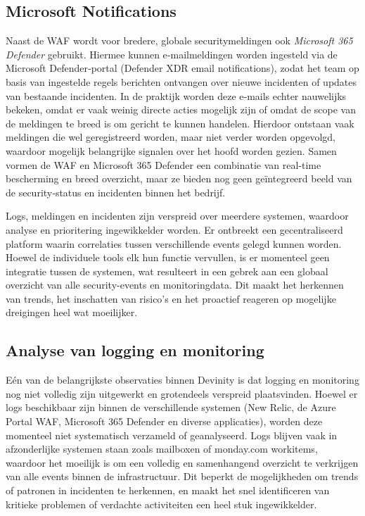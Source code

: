 \subsection{Microsoft Notifications}
Naast de WAF wordt voor bredere, globale securitymeldingen ook \textit{Microsoft 365 Defender} gebruikt. Hiermee kunnen e‑mailmeldingen worden ingesteld via de Microsoft Defender‑portal (Defender XDR email notifications), zodat het team op basis van ingestelde regels berichten ontvangen over nieuwe incidenten of updates van bestaande incidenten. In de praktijk worden deze e‑mails echter nauwelijks bekeken, omdat er vaak weinig directe acties mogelijk zijn of omdat de scope van de meldingen te breed is om gericht te kunnen handelen. Hierdoor ontstaan vaak meldingen die wel geregistreerd worden, maar niet verder worden opgevolgd, waardoor mogelijk belangrijke signalen over het hoofd worden gezien. Samen vormen de WAF en Microsoft 365 Defender een combinatie van real‑time bescherming en breed overzicht, maar ze bieden nog geen geïntegreerd beeld van de security‑status en incidenten binnen het bedrijf.

Logs, meldingen en incidenten zijn verspreid over meerdere systemen, waardoor analyse en prioritering ingewikkelder worden. Er ontbreekt een gecentraliseerd platform waarin correlaties tussen verschillende events gelegd kunnen worden. Hoewel de individuele tools elk hun functie vervullen, is er momenteel geen integratie tussen de systemen, wat resulteert in een gebrek aan een globaal overzicht van alle security-events en monitoringdata. Dit maakt het herkennen van trends, het inschatten van risico’s en het proactief reageren op mogelijke dreigingen heel wat moeilijker.


\subsection{Analyse van logging en monitoring}
Eén van de belangrijkste observaties binnen Devinity is dat logging en monitoring nog niet volledig zijn uitgewerkt en grotendeels verspreid plaatsvinden. Hoewel er logs beschikbaar zijn binnen de verschillende systemen (New Relic, de Azure Portal WAF, Microsoft 365 Defender en diverse applicaties), worden deze momenteel niet systematisch verzameld of geanalyseerd. Logs blijven vaak in afzonderlijke systemen staan zoals mailboxen of monday.com workitems, waardoor het moeilijk is om een volledig en samenhangend overzicht te verkrijgen van alle events binnen de infrastructuur. Dit beperkt de mogelijkheden om trends of patronen in incidenten te herkennen, en maakt het snel identificeren van kritieke problemen of verdachte activiteiten een heel stuk ingewikkelder.

